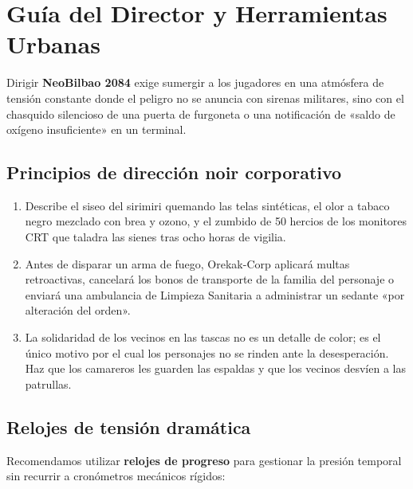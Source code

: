 \chapter{Guía del Director y Herramientas Urbanas}

Dirigir \textbf{NeoBilbao 2084} exige sumergir a los jugadores en una atmósfera de tensión constante donde el peligro no se anuncia con sirenas militares, sino con el chasquido silencioso de una puerta de furgoneta o una notificación de «saldo de oxígeno insuficiente» en un terminal.

\section{Principios de dirección noir corporativo}

\begin{enumerate}
  \item {} Describe el siseo del sirimiri quemando las telas sintéticas, el olor a tabaco negro mezclado con brea y ozono, y el zumbido de 50 hercios de los monitores CRT que taladra las sienes tras ocho horas de vigilia.
  \item {} Antes de disparar un arma de fuego, Orekak-Corp aplicará multas retroactivas, cancelará los bonos de transporte de la familia del personaje o enviará una ambulancia de Limpieza Sanitaria a administrar un sedante «por alteración del orden».
  \item {} La solidaridad de los vecinos en las tascas no es un detalle de color; es el único motivo por el cual los personajes no se rinden ante la desesperación. Haz que los camareros les guarden las espaldas y que los vecinos desvíen a las patrullas.
\end{enumerate}

\section{Relojes de tensión dramática}

Recomendamos utilizar \textbf{relojes de progreso} para gestionar la presión temporal sin recurrir a cronómetros mecánicos rígidos:

